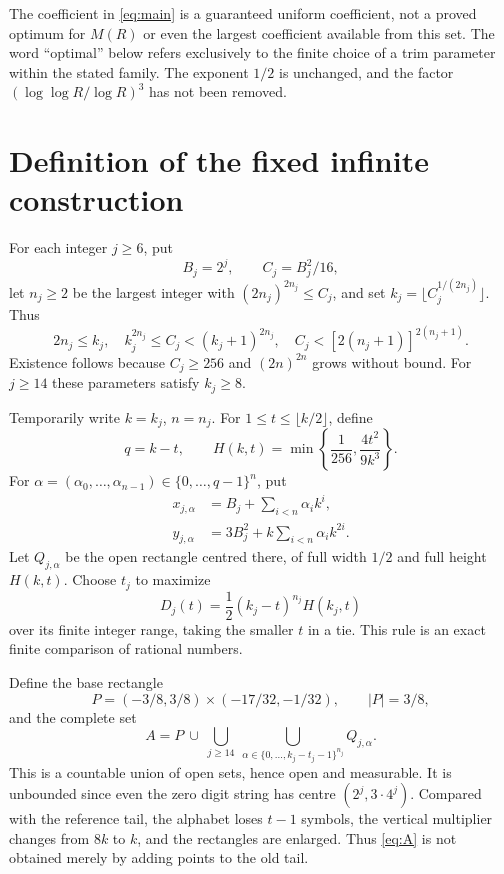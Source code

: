 \documentclass[11pt,a4paper]{article}
\theoremstyle{remark}\newtheorem{remark}[theorem]{Remark}
\begin{document}
The coefficient in \eqref{eq:main} is a guaranteed uniform coefficient, not a
proved optimum for $M(R)$ or even the largest coefficient available from this
set. The word ``optimal'' below refers exclusively to the finite choice of a
trim parameter within the stated family. The exponent $1/2$ is unchanged,
and the factor $(\log\log R/\log R)^3$ has not been removed.

\section{Definition of the fixed infinite construction}
For each integer $j\ge6$, put
\[
 B_j=2^j,\qquad C_j=B_j^2/16,
\]
let $n_j\ge2$ be the largest integer with $(2n_j)^{2n_j}\le C_j$, and set
$k_j=\lfloor C_j^{1/(2n_j)}\rfloor$. Thus
\begin{equation}\label{eq:params}
 2n_j\le k_j,\quad k_j^{2n_j}\le C_j<(k_j+1)^{2n_j},\quad
 C_j<[2(n_j+1)]^{2(n_j+1)}.
\end{equation}
Existence follows because $C_j\ge256$ and $(2n)^{2n}$ grows without bound.
For $j\ge14$ these parameters satisfy $k_j\ge8$.

Temporarily write $k=k_j$, $n=n_j$. For $1\le t\le\lfloor k/2\rfloor$, define
\begin{equation}\label{eq:height}
 q=k-t,\qquad H(k,t)=\min\left\{\frac1{256},\frac{4t^2}{9k^3}\right\}.
\end{equation}
For $\alpha=(\alpha_0,\ldots,\alpha_{n-1})\in\{0,\ldots,q-1\}^n$, put
\begin{align}
 x_{j,\alpha}&=B_j+\sum_{i<n}\alpha_i k^i,\label{eq:x}\\
 y_{j,\alpha}&=3B_j^2+k\sum_{i<n}\alpha_i k^{2i}.
 \label{eq:y}
\end{align}
Let $Q_{j,\alpha}$ be the open rectangle centred there, of full width $1/2$
and full height $H(k,t)$. Choose $t_j$ to maximize
\begin{equation}\label{eq:objective}
 D_j(t)=\frac12(k_j-t)^{n_j}H(k_j,t)
\end{equation}
over its finite integer range, taking the smaller $t$ in a tie. This rule is
an exact finite comparison of rational numbers.

Define the base rectangle
\[
 P=(-3/8,3/8)\times(-17/32,-1/32),\qquad |P|=3/8,
\]
and the complete set
\begin{equation}\label{eq:A}
 A=P\ \cup\ \bigcup_{j\ge14}\ \bigcup_{\alpha\in\{0,\ldots,k_j-t_j-1\}^{n_j}}
 Q_{j,\alpha}.
\end{equation}
This is a countable union of open sets, hence open and measurable. It is
unbounded since even the zero digit string has centre $(2^j,3\cdot4^j)$.
Compared with the reference tail, the alphabet loses $t-1$ symbols, the
vertical multiplier changes from $8k$ to $k$, and the rectangles are enlarged.
Thus \eqref{eq:A} is not obtained merely by adding points to the old tail.
\end{document}
